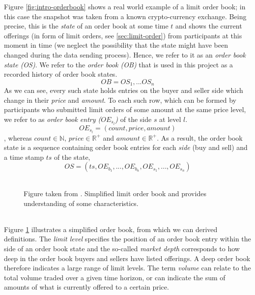 Figure \ref{fig:intro-orderbook} shows a real world example of a limit order book; in this case the snapshot was taken from a known crypto-currency exchange.
Being precise, this is the \textit{state} of an order book at some time $t$ and shows the current offerings (in form of limit orders, see \ref{sec:limit-order}) from participants at this moment in time (we neglect the possibility that the state might have been changed during the data sending process). 
Hence, we refer to it as an \textit{order book state (OS)}.
We refer to the \textit{order book (OB)} that is used in this project as a recorded history of order book states.
\begin{equation}\label{eq:order-book}
OB=OS_1, ... OS_n
\end{equation}
As we can see, every such state holds entries on the buyer and seller side which change in their \textit{price} and \textit{amount}.
To each such row, which can be formed by participants who submitted limit orders of some amount at the same price level, we refer to as \textit{order book entry ($OE_{s_l}$)} of the side $s$ at level $l$.
\begin{equation}
OE_{s_l}=(count, price, amount)
\end{equation}
, whereas $count \in \mathbb{N}$, $price \in \mathbb{R^+}$ and $amount \in \mathbb{R^+}$.
As a result, the order book state is a sequence containing order book entries for each \textit{side} (buy and sell) and a time stamp $ts$ of the state,
\begin{equation}\label{eq:order-book-state}
OS=(ts, OE_{b_1}, ..., OE_{b_n}, OE_{s_1}, ..., OE_{s_n})
\end{equation}
\\
\begin{figure}[H]
    \centering
    \caption{Figure taken from \cite{miranda}. Simplified limit order book and provides understanding of some characteristics.}
    \label{fig:orderbook-simple}
\end{figure}
\hfill
\\
Figure \ref{fig:orderbook-simple} illustrates a simplified order book, from which we can derived definitions.
The \textit{limit level} specifies the position of an order book entry within the side of an order book state and the so-called \textit{market depth} corresponds to how deep in the order book buyers and sellers have listed offerings.
A deep order book therefore indicates a large range of limit levels.
The term \textit{volume} can relate to the total volume traded over a given time horizon, or can indicate the sum of amounts of what is currently offered to a certain price.
